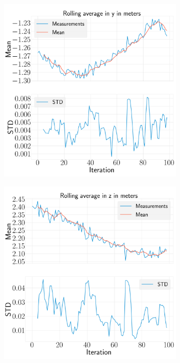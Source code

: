 \documentclass[../Head/report.tex]{subfiles}
\begin{document}
\begin{figure}[H]
\begin{subfigure}[t]{.30\textwidth}
        \includegraphics[width=\textwidth]{../Figures/analyse_rolling_average/test1/Calculated_rolling_average_in_y_with_mean_and_STD.png}
        \caption{}
        \label{fig:rolling_average_in_y_test1}
    \end{subfigure}
     \hspace{0.2em}
    \begin{subfigure}[t]{.30\textwidth}
        \centering
        \includegraphics[width=\textwidth]{../Figures/analyse_rolling_average/test1/Calculated_rolling_average_in_z_with_mean_and_STD.png}

\end{subfigure}
\end{figure}
\end{document}
